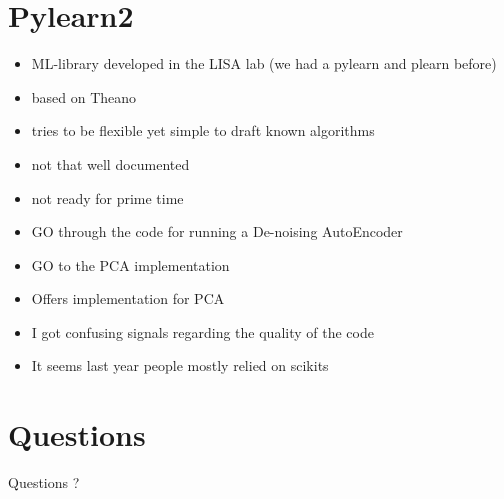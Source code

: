 \documentclass[9pt]{beamer}
\begin{document}
\section{Pylearn2}
\begin{frame}
    \begin{itemize}
  \item ML-library developed in the LISA lab (we had a pylearn and plearn before)
  \item based on Theano
  \item tries to be flexible yet simple to draft known algorithms
  \item not that well documented
  \item not ready for prime time
    \end{itemize}
\end{frame}

\begin{frame}
    \begin{itemize}
        \item GO through the code for running a De-noising AutoEncoder
        \item GO to the PCA implementation
    \end{itemize}
\end{frame}

\begin{frame}
    \begin{itemize}
    \item Offers implementation for PCA
    \item I got confusing signals regarding the quality of the code
    \item It seems last year people mostly relied on scikits
    \end{itemize}
\end{frame}
\section{Questions}
\begin{frame}
    \begin{center}
    {\Huge Questions ? }
    \end{center}
\end{frame}
\end{document}
